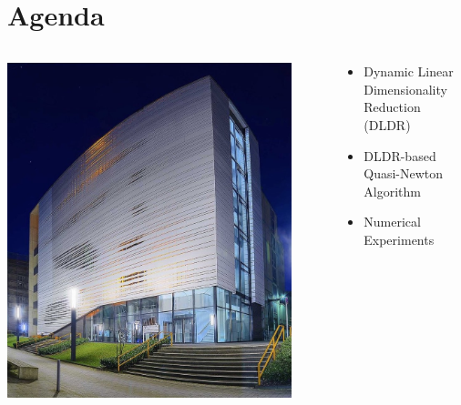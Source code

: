 \documentclass[t]{beamer}
\begin{document}
\section{Agenda}
\begin{frame}
\begin{columns}[c]

\begin{column}{0.5\textwidth}
\begin{center}
\includegraphics[width=0.9\textwidth]{toaster}
\end{center}
\end{column}

\begin{column}{0.5\textwidth}
\begin{itemize}
\item Dynamic Linear Dimensionality Reduction (DLDR) \vspace{1cm}
\item DLDR-based Quasi-Newton Algorithm \vspace{1cm}
\item Numerical Experiments \vspace{1cm} 
\end{itemize}
\end{column}

\end{columns}
\end{frame}
\end{document}
